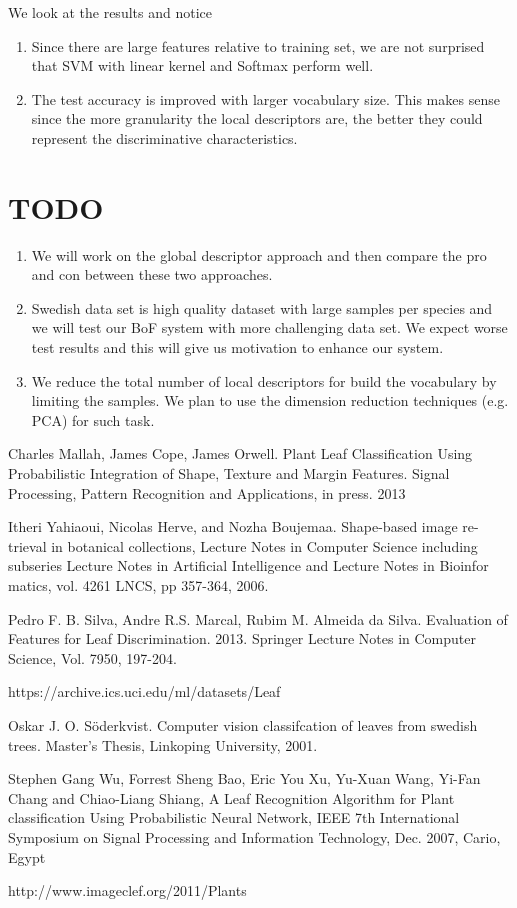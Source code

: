 \documentclass{article}
\begin{document}
We look at the results and notice
\begin{enumerate}
  \item Since there are large features relative to training set, we are not surprised that SVM with linear kernel and Softmax perform well. 
  \item The test accuracy is improved with larger vocabulary size. This makes sense since the more granularity the local descriptors are, the better they could represent the discriminative characteristics.
\end{enumerate}

\section{TODO}
\begin{enumerate}
  \item We will work on the global descriptor approach and then compare the pro and con between these two approaches.
  \item Swedish data set is high quality dataset with large samples per species and we will test our BoF system with more challenging data set. We expect worse test results and this will give us motivation to enhance our system.
  \item We reduce the total number of local descriptors for build the vocabulary by limiting the samples. We plan to use the dimension reduction techniques (e.g. PCA) for such task.
\end{enumerate}

\begin{thebibliography}{9}
Charles Mallah, James Cope, James Orwell. Plant Leaf Classification Using Probabilistic Integration of Shape, Texture and Margin Features. Signal Processing, Pattern Recognition and Applications, in press. 2013

Itheri Yahiaoui, Nicolas Herve, and Nozha Boujemaa. Shape-based image re-trieval in botanical collections, Lecture Notes in Computer Science including subseries Lecture Notes in Artificial Intelligence and Lecture Notes in Bioinfor matics, vol. 4261 LNCS, pp 357-364, 2006.

Pedro F. B. Silva, Andre R.S. Marcal, Rubim M. Almeida da Silva. Evaluation of Features for Leaf Discrimination. 2013. Springer Lecture Notes in Computer Science, Vol. 7950, 197-204.

https://archive.ics.uci.edu/ml/datasets/Leaf

Oskar J. O. Söderkvist. Computer vision classifcation of leaves from swedish trees. Master's Thesis, Linkoping University, 2001.

Stephen Gang Wu, Forrest Sheng Bao, Eric You Xu, Yu-Xuan Wang, Yi-Fan Chang and Chiao-Liang Shiang, A Leaf Recognition Algorithm for Plant classification Using Probabilistic Neural Network, IEEE 7th International Symposium on Signal Processing and Information Technology, Dec. 2007, Cario, Egypt

http://www.imageclef.org/2011/Plants

\end{thebibliography}
\end{document}
